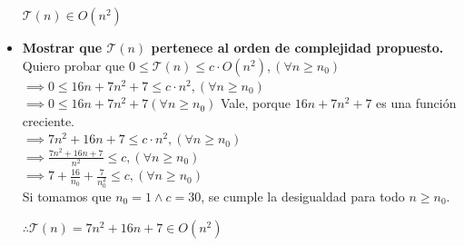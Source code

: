 \documentclass[12 pt]{article}
\begin{document}
\begin{itemize}
            \(\mathcal{T}(n) \in O(n^{2})\)
        \item \textbf{Mostrar que $\mathcal{T}(n)$ pertenece al orden de complejidad propuesto.} \\
            Quiero probar que \(0 \leq \mathcal{T}(n) \leq c \cdot O(n^{2}), (\forall n \geq n_{0})\) \\
            \(\implies 0 \leq 16n+7n^{2}+7 \leq c \cdot n^{2}, (\forall n \geq n_{0})\) \\
            \(\implies 0 \leq 16n+7n^{2}+7 (\forall n \geq n_{0})\) Vale, porque $16n+7n^{2}+7$ es una función creciente.\\
            \(\implies 7n^{2}+16n+7 \leq c \cdot n^{2}, (\forall n \geq n_{0})\) \\
            \(\implies \frac{7n^{2}+16n+7}{n^{2}} \leq c, (\forall n \geq n_{0})\) \\
            \(\implies 7+\frac{16}{n_{0}}+\frac{7}{n^{2}_{0}} \leq c, (\forall n \geq n_{0})\) \\
            Si tomamos que \(n_{0} = 1 \wedge c = 30\), se cumple la desigualdad para todo $n \geq n_{0}$.
            \begin{center}
                \(\therefore \mathcal{T}(n) = 7n^{2}+16n+7 \in O(n^{2})\)
            \end{center} 
    \end{itemize}
\end{document}
